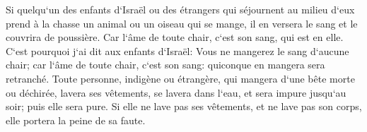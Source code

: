 \verse Si quelqu`un des enfants d`Israël ou des étrangers qui séjournent au milieu d`eux prend à la chasse un animal ou un oiseau qui se mange, il en versera le sang et le couvrira de poussière. 
\verse Car l`âme de toute chair, c`est son sang, qui est en elle. C`est pourquoi j`ai dit aux enfants d`Israël: Vous ne mangerez le sang d`aucune chair; car l`âme de toute chair, c`est son sang: quiconque en mangera sera retranché. 
\verse Toute personne, indigène ou étrangère, qui mangera d`une bête morte ou déchirée, lavera ses vêtements, se lavera dans l`eau, et sera impure jusqu`au soir; puis elle sera pure. 
\verse Si elle ne lave pas ses vêtements, et ne lave pas son corps, elle portera la peine de sa faute. 


